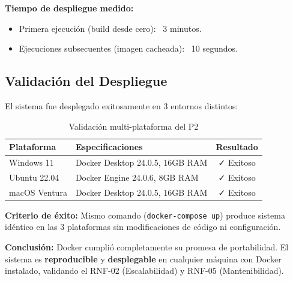 \textbf{Tiempo de despliegue medido:}
\begin{itemize}
    \item Primera ejecución (build desde cero): ~3 minutos.
    \item Ejecuciones subsecuentes (imagen cacheada): ~10 segundos.
\end{itemize}

\subsection{Validación del Despliegue}
\label{subsec:validacion_despliegue}

El sistema fue desplegado exitosamente en 3 entornos distintos:

\begin{table}[h]
\centering
\caption{Validación multi-plataforma del P2}
\begin{tabular}{|l|l|c|}
\hline
\textbf{Plataforma} & \textbf{Especificaciones} & \textbf{Resultado} \\ \hline
Windows 11 & Docker Desktop 24.0.5, 16GB RAM & ✓ Exitoso \\ \hline
Ubuntu 22.04 & Docker Engine 24.0.6, 8GB RAM & ✓ Exitoso \\ \hline
macOS Ventura & Docker Desktop 24.0.5, 16GB RAM & ✓ Exitoso \\ \hline
\end{tabular}
\end{table}

\textbf{Criterio de éxito:} Mismo comando (\texttt{docker-compose up}) produce sistema idéntico en las 3 plataformas sin modificaciones de código ni configuración.

\textbf{Conclusión:} Docker cumplió completamente su promesa de portabilidad. El sistema es \textbf{reproducible} y \textbf{desplegable} en cualquier máquina con Docker instalado, validando el RNF-02 (Escalabilidad) y RNF-05 (Mantenibilidad).